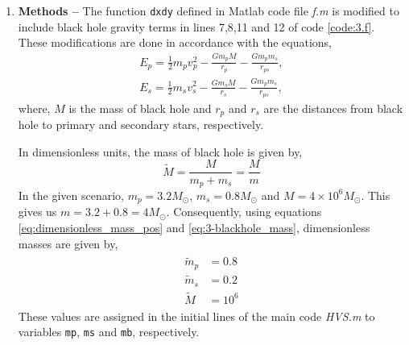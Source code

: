 \documentclass[a4paper]{article}
\begin{document}
			
			
			\begin{enumerate} [label*=\textbf{(\alph*)}]
	
	
				\item
					\subitem \textbf{Methods  --}
					The function \texttt{dxdy} defined in Matlab code file \emph{f.m} is modified to include black hole gravity terms in lines 7,8,11 and 12 of code \ref{code:3.f}. These modifications are done in accordance with the equations,
					\begin{equation}
						\begin{gathered}
							E_p = \frac{1}{2} m_p v_p^2 - \frac{G m_p M}{r_p} - \frac{G m_p m_s}{r_{ps}}, \\
							E_s = \frac{1}{2} m_s v_s^2 - \frac{G m_s M}{r_s} - \frac{G m_p m_s}{r_{ps}},
						\end{gathered}
					\end{equation}
					where, \(M\) is the mass of black hole and \(r_p\) and \(r_s\) are the distances from black hole to primary and secondary stars, respectively.
					
					\begin{figure} [h]
						
					\end{figure}
					
					In dimensionless units, the mass of black hole is given by,
					\begin{equation}
							\tilde{M} = \frac{M}{m_p+m_s} = \frac{M}{m}
							\label{eq:3-blackhole_mass}
					\end{equation}
					 In the given scenario, \(m_p = 3.2 M_\odot\), \(m_s = 0.8 M_\odot\) and \(M = 4 \times 10^6 M_\odot\). This gives us \(m = 3.2+0.8 = 4 M_\odot\). Consequently, using equations \ref{eq:dimensionless_mass_pos} and \ref{eq:3-blackhole_mass}, dimensionless masses are given by,
					 \begin{equation}
					 	\begin{gathered}
					 		\begin{aligned}
					 			\tilde{m}_p &= 0.8 \\
					 			\tilde{m}_s &= 0.2 \\
					 			\tilde{M} &= 10^6
					 		\end{aligned}
					 	\end{gathered}
				 		\label{eq:3-dimensionless_masses}
					 \end{equation}
					These values are assigned in the initial lines of the main code \emph{HVS.m} to variables \texttt{mp}, \texttt{ms} and \texttt{mb}, respectively.
					

\end{enumerate}
\end{document}
